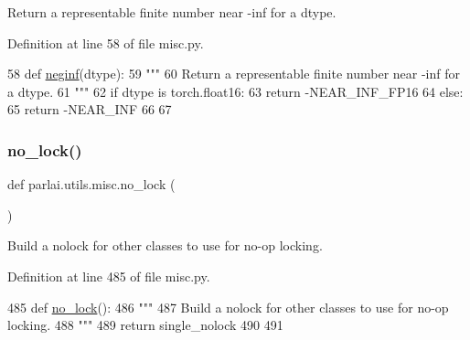 \begin{DoxyVerb}Return a representable finite number near -inf for a dtype.
\end{DoxyVerb}
 

Definition at line 58 of file misc.\+py.


\begin{DoxyCode}
58 \textcolor{keyword}{def }\hyperlink{namespaceparlai_1_1utils_1_1misc_a68c44ca571de7149b683539db659c330}{neginf}(dtype):
59     \textcolor{stringliteral}{"""}
60 \textcolor{stringliteral}{    Return a representable finite number near -inf for a dtype.}
61 \textcolor{stringliteral}{    """}
62     \textcolor{keywordflow}{if} dtype \textcolor{keywordflow}{is} torch.float16:
63         \textcolor{keywordflow}{return} -NEAR\_INF\_FP16
64     \textcolor{keywordflow}{else}:
65         \textcolor{keywordflow}{return} -NEAR\_INF
66 
67 
\end{DoxyCode}
\mbox{\label{namespaceparlai_1_1utils_1_1misc_a38a23cfa0fc3dbed42846787d1c04b57}} 
\subsubsection{\texorpdfstring{no\+\_\+lock()}{no\_lock()}}
{\footnotesize\ttfamily def parlai.\+utils.\+misc.\+no\+\_\+lock (\begin{DoxyParamCaption}{ }\end{DoxyParamCaption})}

\begin{DoxyVerb}Build a nolock for other classes to use for no-op locking.
\end{DoxyVerb}
 

Definition at line 485 of file misc.\+py.


\begin{DoxyCode}
485 \textcolor{keyword}{def }\hyperlink{namespaceparlai_1_1utils_1_1misc_a38a23cfa0fc3dbed42846787d1c04b57}{no\_lock}():
486     \textcolor{stringliteral}{"""}
487 \textcolor{stringliteral}{    Build a nolock for other classes to use for no-op locking.}
488 \textcolor{stringliteral}{    """}
489     \textcolor{keywordflow}{return} single\_nolock
490 
491 
\end{DoxyCode}
\mbox{\label{namespaceparlai_1_1utils_1_1misc_ad96b0c9ef6237d9ca051251089faf2c7}} 
